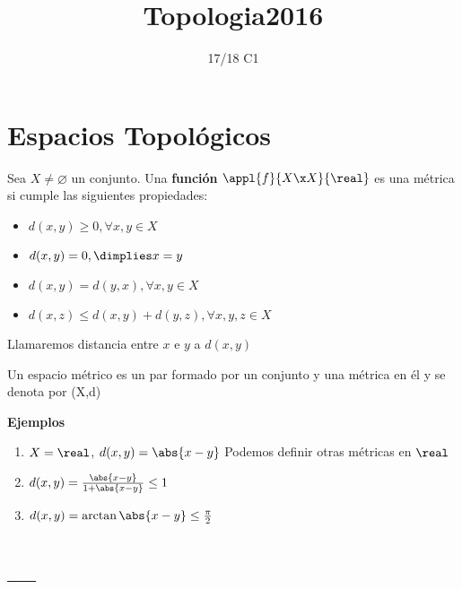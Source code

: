 \documentclass[palatino]{apuntes}
\title{Topologia2016}
\author{}
\date{17/18 C1}
\begin{document}
\pagestyle{plain}
\maketitle

\tableofcontents
\newpage

\chapter{Espacios Topológicos}

\begin{defn}[Métrica]
	Sea $ X \neq \varnothing $ un conjunto. Una \textbf{función} $ \appl{f}{X \x X}{\real} $ es una métrica si cumple las siguientes propiedades:

	\begin{itemize}
		\item $ d(x,y) \geq 0, \forall x, y \in X $
		\item $ d(x,y) = 0, \dimplies x = y $
		\item $ d(x,y) = d(y,x), \forall x, y \in X $
		\item $ d(x,z) \leq d(x,y) + d(y,z), \forall x, y, z \in X $
	\end{itemize}
	
	Llamaremos distancia entre $ x $ e $ y $ a $ d(x,y) $
\end{defn}

\begin{defn}
	Un espacio métrico es un par formado por un conjunto y una métrica en él y se denota por (X,d)
\end{defn}

\textbf{Ejemplos}

\begin{enumerate}
	\item $ X = \real $, $d(x,y) = \abs{x-y} $ Podemos definir otras métricas en $ \real $
	\item $ d(x,y)= \frac{\abs{x-y}}{1+\abs{x-y}} \leq 1 $
	\item $ d(x,y)= \arctan{\abs{x-y}} \leq \frac{\pi}{2} $
\end{enumerate}

\appendix

\chapter{---}


\printindex
\end{document}
